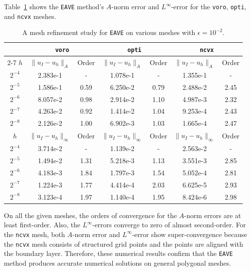 \documentclass[a4paper]{article}
\theoremstyle{plain}
\theoremstyle{definition}
\numberwithin{equation}{section}
\newcommand{\norm}[1]{\lVert #1\rVert}
\begin{document}
Table~\ref{table: mesh refinement} shows the \texttt{EAVE} method's $A$-norm error and $L^\infty$-error for the \texttt{voro}, \texttt{opti}, and \texttt{ncvx} meshes.
\begin{table}[!h]
\footnotesize
\caption{A mesh refinement study for \texttt{EAVE} on various meshes with $\epsilon=10^{-2}$.}
    \label{table: mesh refinement}
    \centering
    \begin{tabular}{|c||c|c||c|c||c|c|}
    \hline
        &  \multicolumn{2}{c||}{\texttt{voro}
        } & 
         \multicolumn{2}{c||}{\texttt{opti}
        } &
        \multicolumn{2}{c|}{\texttt{ncvx}}\\
    \cline{2-7}   
       $h$  & {$\norm{u_I-u_h}_A$} & {Order} &
       {$\norm{u_I-u_h}_A$} & {Order} &
       {$\norm{u_I-u_h}_A$} & {Order} \\ 
       \hline
       $2^{-4}$ & 2.383e-1 & - &  1.078e-1 & - & 1.355e-1 & - \\
       \hline
       $2^{-5}$  & 1.586e-1 & 0.59 & 6.250e-2 & 0.79 & 2.488e-2 & 2.45  \\
       \hline
       $2^{-6}$   & 8.057e-2 & 0.98 & 2.914e-2 & 1.10 & 4.987e-3 & 2.32  \\
       \hline
       $2^{-7}$  & 4.263e-2 & 0.92 & 1.414e-2 & 1.04 & 9.253e-4 & 2.43 \\
       \hline
       $2^{-8}$  & 2.126e-2 & 1.00 & 6.902e-3 & 1.03 & 1.665e-4 & 2.47 \\
       \hline
       \hline
        $h$ & {$\norm{u_I-u_h}_\infty$} & {Order} &
       {$\norm{u_I-u_h}_\infty$} & {Order} &
       {$\norm{u_I-u_h}_\infty$} & {Order} \\ 
       \hline
       $2^{-4}$ & 3.714e-2 & - &  1.139e-2 & - & 2.563e-2 & - \\
       \hline
       $2^{-5}$  & 1.494e-2 & 1.31 & 5.218e-3 & 1.13 & 3.551e-3 & 2.85 \\
       \hline
       $2^{-6}$   & 4.183e-3 & 1.84 & 1.797e-3 & 1.54 & 5.052e-4 & 2.81 \\
       \hline
       $2^{-7}$  & 1.224e-3 & 1.77 & 4.414e-4 & 2.03 & 6.625e-5 & 2.93 \\
       \hline
       $2^{-8}$  & 3.123e-4 & 1.97 & 1.140e-4 & 1.95 & 8.424e-6 & 2.98 \\
       \hline
    \end{tabular}
\end{table}
On all the given meshes, the orders of convergence for the $A$-norm errors are at least first-order.
Also, the $L^\infty$-errors converge to zero of almost second-order.
For the \texttt{ncvx} mesh, both $A$-norm error and $L^\infty$-error show super-convergence because the \texttt{ncvx} mesh consists of structured grid points and the points are aligned with the boundary layer.
Therefore, these numerical results confirm that the \texttt{EAVE} method produces accurate numerical solutions on general polygonal meshes.
\end{document}
